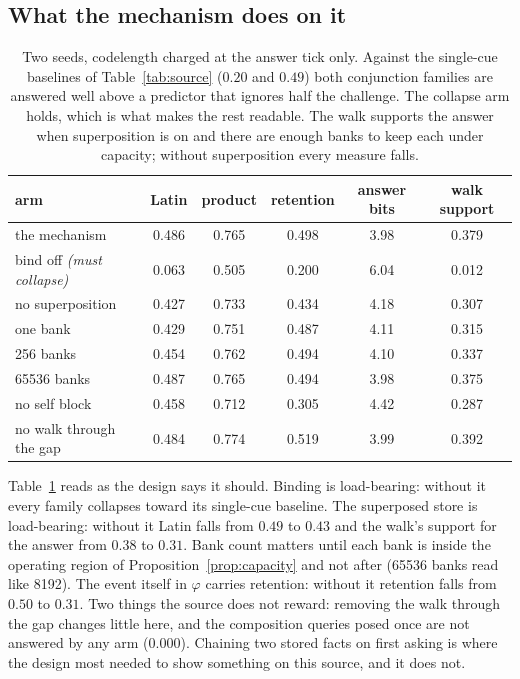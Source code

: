 \documentclass[11pt,a4paper]{article}
\theoremstyle{plain}
\theoremstyle{definition}
\theoremstyle{remark}
\begin{document}
\subsection{What the mechanism does on it}

\begin{table}[h]
\centering
\small
\begin{tabular}{lccccc}
\toprule
arm & Latin & product & retention & answer bits & walk support\\
\midrule
the mechanism & 0.486 & 0.765 & 0.498 & 3.98 & 0.379\\
\midrule
bind off \emph{(must collapse)} & 0.063 & 0.505 & 0.200 & 6.04 & 0.012\\
no superposition & 0.427 & 0.733 & 0.434 & 4.18 & 0.307\\
one bank & 0.429 & 0.751 & 0.487 & 4.11 & 0.315\\
256 banks & 0.454 & 0.762 & 0.494 & 4.10 & 0.337\\
65536 banks & 0.487 & 0.765 & 0.494 & 3.98 & 0.375\\
no self block & 0.458 & 0.712 & 0.305 & 4.42 & 0.287\\
no walk through the gap & 0.484 & 0.774 & 0.519 & 3.99 & 0.392\\
\bottomrule
\end{tabular}
\caption{Two seeds, codelength charged at the answer tick only. Against the
single-cue baselines of Table~\ref{tab:source} ($0.20$ and $0.49$) both
conjunction families are answered well above a predictor that ignores half the
challenge. The collapse arm holds, which is what makes the rest readable. The
walk supports the answer when superposition is on and there are enough banks to
keep each under capacity; without superposition every measure falls.}
\label{tab:synthetic}
\end{table}

Table~\ref{tab:synthetic} reads as the design says it should. Binding is
load-bearing: without it every family collapses toward its single-cue baseline.
The superposed store is load-bearing: without it Latin falls from $0.49$ to
$0.43$ and the walk's support for the answer from $0.38$ to $0.31$. Bank count
matters until each bank is inside the operating region of
Proposition~\ref{prop:capacity} and not after (65536 banks read like 8192). The
event itself in $\varphi$ carries retention: without it retention falls from
$0.50$ to $0.31$. Two things the source does not reward: removing the walk
through the gap changes little here, and the composition queries posed once
are not answered by any arm ($0.000$). Chaining two stored facts on first
asking is where the design most needed to show something on this source, and
it does not.
\end{document}
